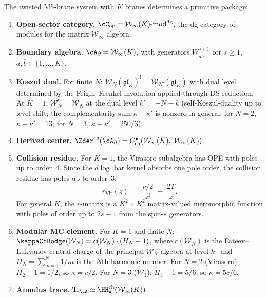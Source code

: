 \begin{conjecture}
\label{conj:twisted-M5-primitive-package}
The twisted M5-brane system with $K$ branes determines a
primitive package:
\begin{enumerate}[label=\textup{(\roman*)},nosep]
\item \textbf{Open-sector category.}
 $\cC_{\mathrm{op}} = \mathcal{W}_\infty(K)\text{-}\mathrm{mod}^{\mathrm{dg}}$,
 the dg-category of modules for the matrix
 $\mathcal{W}_\infty$ algebra.

\item \textbf{Boundary algebra.}
 $\cA_\partial = \mathcal{W}_\infty(K)$,
 with generators $W^{(s)}_{a\bar b}$ for $s \ge 1$,
 $a, \bar b \in \{1, \ldots, K\}$.

\item \textbf{Koszul dual.}
 For finite $N$:
 $\mathcal{W}_N(\mathfrak{gl}_K)^!
 = \mathcal{W}_{N'}(\mathfrak{gl}_K)$
 with dual level determined by the Feigin--Frenkel involution
 applied through DS reduction. At $K = 1$:
 $\mathcal{W}_N^! = \mathcal{W}_N$ at the dual level
 $k' = -N - k$ \textup{(}self-Koszul-duality up to level shift;
 the complementarity sum $\kappa + \kappa'$ is nonzero
 in general: for $N = 2$, $\kappa + \kappa' = 13$;
 for $N = 3$, $\kappa + \kappa' = 250/3$\textup{)}.

\item \textbf{Derived center.}
 $\Zder^{\mathrm{ch}}(\cA_\partial)
 = C^\bullet_{\mathrm{ch}}(\mathcal{W}_\infty(K),\;
 \mathcal{W}_\infty(K))$.

\item \textbf{Collision residue.}
 For $K = 1$, the Virasoro subalgebra has OPE with poles up to
 order~$4$. Since the $d\log$ bar kernel absorbs one pole order, the collision residue has poles up to order~$3$:
 \[
 r_{\mathrm{Vir}}(z)
 \;=\;
 \frac{c/2}{z^3} \;+\; \frac{2T}{z}.
 \]
 For general $K$, the $r$-matrix is a $K^2 \times K^2$ matrix-valued
 meromorphic function with poles of order up to $2s-1$ from the
 spin-$s$ generators.

\item \textbf{Modular MC element.}
 For $K = 1$ and finite $N$: $\kappaChHodge(\mathcal{W}_N)
 = c(\mathcal{W}_N) \cdot (H_N - 1)$, where $c(\mathcal{W}_N)$ is the
 Fateev--Lukyanov central charge of the principal
 $\mathcal{W}_N$-algebra at level $k$~\cite{FL88} and
 $H_N = \sum_{m=1}^N 1/m$ is the $N$th harmonic number.
 For $N = 2$ \textup{(}Virasoro\textup{)}: $H_2 - 1 = 1/2$,
 so $\kappa = c/2$.
 For $N = 3$ \textup{(}$\mathcal{W}_3$\textup{)}: $H_3 - 1 = 5/6$,
 so $\kappa = 5c/6$.

\item \textbf{Annulus trace.}
 $\operatorname{Tr}_\cA \simeq
 \HH^{\mathrm{ch}}_\bullet(\mathcal{W}_\infty(K))$.
\end{enumerate}
\end{conjecture}

